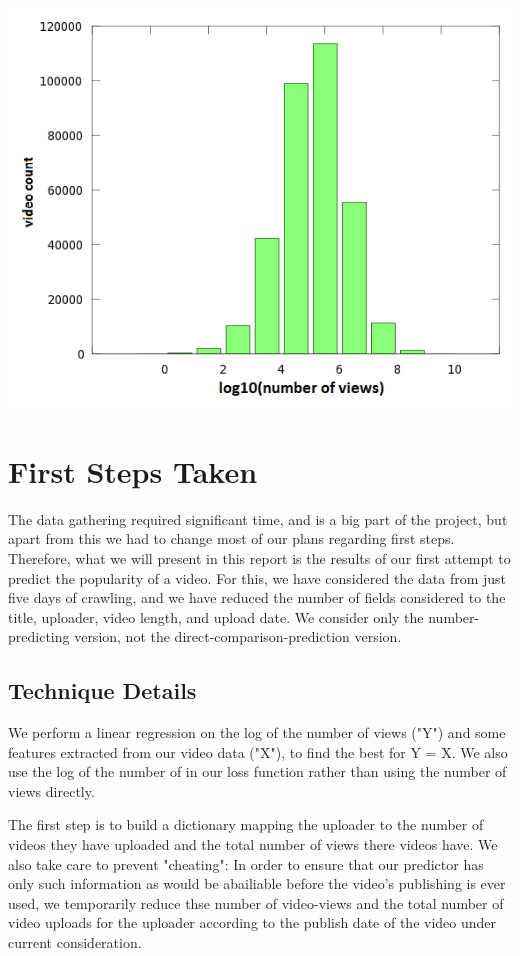\documentclass{article} %
\begin{document}
\includegraphics[totalheight=1\textheight,width=1\textwidth,viewport=0 0 580 480,clip]{DistributionOfViews.png}

\section{First Steps Taken}

The data gathering required significant time, and is a big part of the project, but apart from this we had to change most of our plans regarding first steps.  Therefore, what we will present in this report is the results of our first attempt to predict the popularity of a video.  For this, we have considered the data from just five days of crawling, and we have reduced the number of fields considered to the title, uploader, video length, and upload date.  We consider only the number-predicting version, not the direct-comparison-prediction version.

\subsection{Technique Details}

We perform  a linear regression on the log of the number of views ("Y") and some features extracted from our video data ("X"), to find the best \beta for Y  = \beta * X.  We also use the log of the number of in our loss function rather than using the number of views directly.

The first step is to build a dictionary mapping the uploader to the number of videos they have uploaded and the total number of views there videos have. We also take care to prevent "cheating":  In order to ensure that our predictor has only such information as would be abailiable before the video's publishing is ever used, we temporarily reduce thse number of video-views and the total number of video uploads for the uploader according to the publish date of the video under current consideration.
\end{document}
